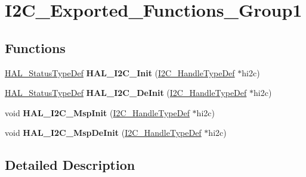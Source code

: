 \hypertarget{group___i2_c___exported___functions___group1}{}\section{I2\+C\+\_\+\+Exported\+\_\+\+Functions\+\_\+\+Group1}
\label{group___i2_c___exported___functions___group1}
\subsection*{Functions}
\begin{DoxyCompactItemize}
\item 
\hyperlink{stm32f4xx__hal__def_8h_a63c0679d1cb8b8c684fbb0632743478f}{H\+A\+L\+\_\+\+Status\+Type\+Def} {\bfseries H\+A\+L\+\_\+\+I2\+C\+\_\+\+Init} (\hyperlink{struct_i2_c___handle_type_def}{I2\+C\+\_\+\+Handle\+Type\+Def} $\ast$hi2c)\hypertarget{group___i2_c___exported___functions___group1_ga9d29159a6da072287fff73743fd93260}{}\label{group___i2_c___exported___functions___group1_ga9d29159a6da072287fff73743fd93260}

\item 
\hyperlink{stm32f4xx__hal__def_8h_a63c0679d1cb8b8c684fbb0632743478f}{H\+A\+L\+\_\+\+Status\+Type\+Def} {\bfseries H\+A\+L\+\_\+\+I2\+C\+\_\+\+De\+Init} (\hyperlink{struct_i2_c___handle_type_def}{I2\+C\+\_\+\+Handle\+Type\+Def} $\ast$hi2c)\hypertarget{group___i2_c___exported___functions___group1_gabda634ba18f874775d1262c887d273b4}{}\label{group___i2_c___exported___functions___group1_gabda634ba18f874775d1262c887d273b4}

\item 
void {\bfseries H\+A\+L\+\_\+\+I2\+C\+\_\+\+Msp\+Init} (\hyperlink{struct_i2_c___handle_type_def}{I2\+C\+\_\+\+Handle\+Type\+Def} $\ast$hi2c)\hypertarget{group___i2_c___exported___functions___group1_gabe01a202c27b23fc150aa66af3130073}{}\label{group___i2_c___exported___functions___group1_gabe01a202c27b23fc150aa66af3130073}

\item 
void {\bfseries H\+A\+L\+\_\+\+I2\+C\+\_\+\+Msp\+De\+Init} (\hyperlink{struct_i2_c___handle_type_def}{I2\+C\+\_\+\+Handle\+Type\+Def} $\ast$hi2c)\hypertarget{group___i2_c___exported___functions___group1_ga2ec8d9b09854c732e2feed549278f048}{}\label{group___i2_c___exported___functions___group1_ga2ec8d9b09854c732e2feed549278f048}

\end{DoxyCompactItemize}


\subsection{Detailed Description}
